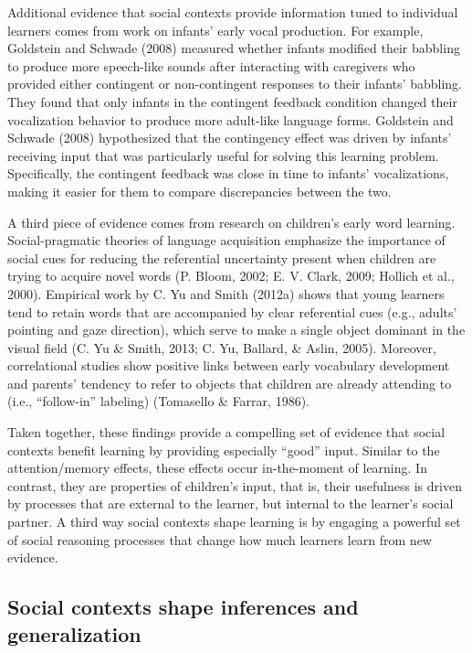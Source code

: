 \documentclass[english,floatsintext,man]{apa6}
\theoremstyle{definition}
\theoremstyle{definition}
\theoremstyle{definition}
\theoremstyle{remark}
\begin{document}
Additional evidence that social contexts provide information tuned to
individual learners comes from work on infants' early vocal production.
For example, Goldstein and Schwade (2008) measured whether infants
modified their babbling to produce more speech-like sounds after
interacting with caregivers who provided either contingent or
non-contingent responses to their infants' babbling. They found that
only infants in the contingent feedback condition changed their
vocalization behavior to produce more adult-like language forms.
Goldstein and Schwade (2008) hypothesized that the contingency effect
was driven by infants' receiving input that was particularly useful for
solving this learning problem. Specifically, the contingent feedback was
close in time to infants' vocalizations, making it easier for them to
compare discrepancies between the two.

A third piece of evidence comes from research on children's early word
learning. Social-pragmatic theories of language acquisition emphasize
the importance of social cues for reducing the referential uncertainty
present when children are trying to acquire novel words (P. Bloom, 2002;
E. V. Clark, 2009; Hollich et al., 2000). Empirical work by C. Yu and
Smith (2012a) shows that young learners tend to retain words that are
accompanied by clear referential cues (e.g., adults' pointing and gaze
direction), which serve to make a single object dominant in the visual
field (C. Yu \& Smith, 2013; C. Yu, Ballard, \& Aslin, 2005). Moreover,
correlational studies show positive links between early vocabulary
development and parents' tendency to refer to objects that children are
already attending to (i.e., \enquote{follow-in} labeling) (Tomasello \&
Farrar, 1986).

Taken together, these findings provide a compelling set of evidence that
social contexts benefit learning by providing especially \enquote{good}
input. Similar to the attention/memory effects, these effects occur
in-the-moment of learning. In contrast, they are properties of
children's input, that is, their usefulness is driven by processes that
are external to the learner, but internal to the learner's social
partner. A third way social contexts shape learning is by engaging a
powerful set of social reasoning processes that change how much learners
learn from new evidence.

\subsection{Social contexts shape inferences and
generalization}\label{social-contexts-shape-inferences-and-generalization}
\end{document}
